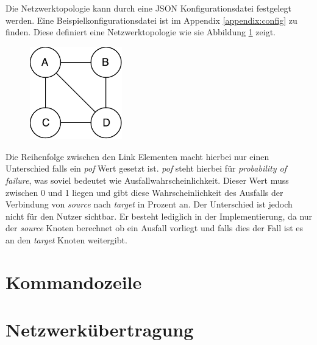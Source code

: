 \documentclass[a4paper,ngerman]{article}
\begin{document}
Die Netzwerktopologie kann durch eine JSON Konfigurationsdatei festgelegt werden. Eine Beispielkonfigurationsdatei ist im Appendix \ref{appendix:config} zu finden. Diese definiert eine Netzwerktopologie wie sie Abbildung \ref{fig:topology} zeigt.

\begin{figure}[!htb]
    \centering
    \includegraphics[width=4cm,keepaspectratio]{topology2}
    \caption{}
    \label{fig:topology}
\end{figure}

Die Reihenfolge zwischen den Link Elementen macht hierbei nur einen Unterschied falls ein \textit{pof} Wert gesetzt ist. \textit{pof} steht hierbei für \textit{probability of failure}, was soviel bedeutet wie Ausfallwahrscheinlichkeit. Dieser Wert muss zwischen 0 und 1 liegen und gibt diese Wahrscheinlichkeit des Ausfalls der Verbindung von \textit{source} nach \textit{target} in Prozent an. Der Unterschied ist jedoch nicht für den Nutzer sichtbar. Er besteht lediglich in der Implementierung, da nur der \textit{source} Knoten berechnet ob ein Ausfall vorliegt und falls dies der Fall ist es an den \textit{target} Knoten weitergibt.

\section{Kommandozeile}

\section{Netzwerkübertragung}
\end{document}
